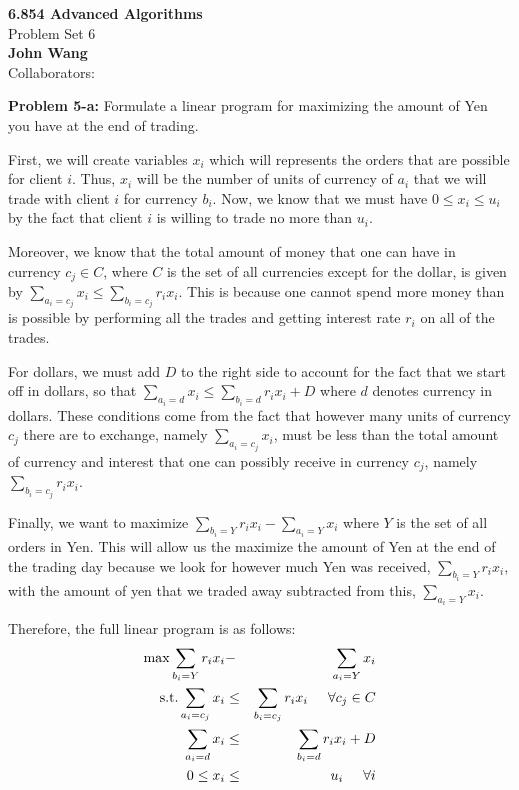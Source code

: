 \documentclass[psamsfonts]{amsart}
\newenvironment{sol}{\vspace{0.25cm}{\large \bfseries Solution:}}{\qedsymbol}
\newenvironment{prob}[1]{\begin{framed}{\large \bfseries Problem #1:}}{\end{framed}}
\newcommand{\makenewtitle}{
    \begin{center}
    {\huge \bfseries 6.854 Advanced Algorithms} \\
    Problem Set 6\\
    \vspace{0.25cm}
    {\bfseries John Wang} \\
    Collaborators: 
    \end{center}
    \vspace{0.5cm}
}
\begin{document}
\newpage
\makenewtitle

\begin{prob}{5-a}
Formulate a linear program for maximizing the amount of Yen you have at the end of trading.
\end{prob}
\begin{sol}
First, we will create variables $x_i$ which will represents the orders that are possible for client $i$. Thus, $x_i$ will be the number of units of currency of $a_i$ that we will trade with client $i$ for currency $b_i$. Now, we know that we must have $0 \leq x_i \leq u_i$ by the fact that client $i$ is willing to trade no more than $u_i$. 

Moreover, we know that the total amount of money that one can have in currency $c_j \in C$, where $C$ is the set of all currencies except for the dollar, is given by $\sum_{a_i = c_j} x_i \leq \sum_{b_i = c_j} r_i x_i$. This is because one cannot spend more money than is possible by performing all the trades and getting interest rate $r_i$ on all of the trades. 

For dollars, we must add $D$ to the right side to account for the fact that we start off in dollars, so that $\sum_{a_i = d} x_i \leq \sum_{b_i = d} r_i x_i + D$ where $d$ denotes currency in dollars. These conditions come from the fact that however many units of currency $c_j$ there are to exchange, namely $\sum_{a_i = c_j} x_i$, must be less than the total amount of currency and interest that one can possibly receive in currency $c_j$, namely $\sum_{b_i = c_j} r_i x_i$. 

Finally, we want to maximize $\sum_{b_i = Y} r_i x_i - \sum_{a_i = Y} x_i$ where $Y$ is the set of all orders in Yen. This will allow us the maximize the amount of Yen at the end of the trading day because we look for however much Yen was received, $\sum_{b_i = Y} r_i x_i$, with the amount of yen that we traded away subtracted from this, $\sum_{a_i = Y} x_i$. 

Therefore, the full linear program is as follows:
\begin{eqnarray}
\max \sum_{b_i = Y} r_i x_i &-& \sum_{a_i = Y} x_i \\
\text{s.t.} \sum_{a_i = c_j} x_i &\leq& \sum_{b_i = c_j} r_i x_i \hspace{0.5cm} \forall c_j \in C \\
\sum_{a_i = d} x_i &\leq& \sum_{b_i = d} r_i x_i + D \\
0 \leq x_i &\leq& u_i  \hspace{0.5cm} \forall i
\end{eqnarray}
\end{sol}
\end{document}
